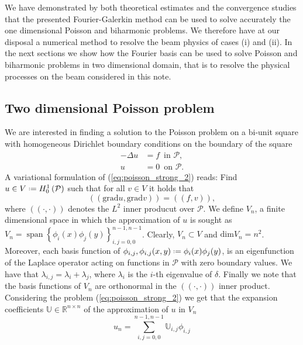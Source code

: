 \documentclass[a4paper,10pt]{article}
\newcommand{\R}{\ensuremath{\mathbb{R}}}
\newcommand{\Inner}[2]{\ensuremath{\left(\left(#1, #2\right)\right)}}
\newcommand{\Grad}[1]{\ensuremath{\text{grad}#1}}
\newcommand*{\defeq}{\mathrel{\vcenter{\baselineskip0.5ex \lineskiplimit0pt
                     \hbox{\scriptsize.}\hbox{\scriptsize.}}}%
                     =}
\DeclareMathOperator{\spn}{span}
\begin{document}
  We have demonstrated by both theoretical estimates and the convergence studies
  that the presented Fourier-Galerkin method can be used to solve accurately 
  the one dimensional Poisson and biharmonic problems. We therefore have at our
  disposal a numerical method to resolve the beam physics of cases (i) and (ii).
  In the next sections we show how the Fourier basis can be used to solve
  Poisson and biharmonic problems in two dimensional domain, that is to resolve
  the physical processes on the beam considered in this note.

  \subsection{Two dimensional Poisson problem}
  We are interested in finding a solution to the Poisson problem on a bi-unit
  square with homogeneous Dirichlet boundary conditions on the boundary of the
  square
  \begin{equation}
  \label{eq:poisson_strong_2}
  \begin{aligned}
    -\Delta u &= f\,\text{ in }\mathcal{P},\\
            u &= 0\,\text{ on }\mathcal{P}.
  \end{aligned}
  \end{equation}
  A variational formulation of (\ref{eq:poisson_strong_2}) reads: Find $u\in
  V\defeq H^1_0\left(\mathcal{P}\right)$ such that for all $v\in V$ it holds
  that
  \begin{equation}
    \label{eq:poisson_weak_2}
    \Inner{\Grad{u}}{\Grad{v}} = \Inner{f}{v},
  \end{equation}
  where $\Inner{\cdot}{\cdot}$ denotes the $L^2$ inner producut over $\mathcal{P}$.
  We define $V_n$, a finite dimensional space in which the approximation of $u$
  is sought as $V_n=\spn\left\{\phi_i(x)\phi_j(y)\right\}_{i, j = 0, 0}^{n-1, n-1}$.
  Clearly, $V_n\subset V$ and $\text{dim}V_n = n^2$. Moreover, each basis function of
  $\phi_{i, j}, \phi_{i, j}(x, y)\defeq\phi_i(x)\phi_j(y)$, is an eigenfunction
  of the Laplace operator acting on functions in $\mathcal{P}$ with zero boundary
  values. We have that $\lambda_{i, j}=\lambda_i + \lambda_j$, where $\lambda_i$
  is the $i$-th eigenvalue of $\delta$. Finally we note that the basis functions
  of $V_n$ are orthonormal in the $\Inner{\cdot}{\cdot}$ inner product.
  Considering the problem (\ref{eq:poisson_strong_2}) we get that the expansion
  coefficients $\mathbb{U}\in\R^{n\times n}$ of the approximation of $u$ in $V_n$
  \[
    u_n=\sum\limits_{i, j = 0, 0}^{n-1, n-1}\mathbb{U}_{i,
    j}\phi_{i, j}
  \]
\end{document}
